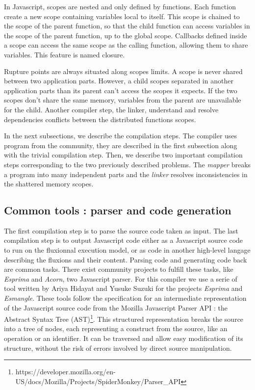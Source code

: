 In Javascript, scopes are nested and only defined by functions.
Each function create a new scope containing variables local to itself.
This scope is chained to the scope of the parent function, so that the child function can access variables in the scope of the parent function, up to the global scope.
Callbacks defined inside a scope can access the same scope as the calling function, allowing them to share variables.
This feature is named closure.

Rupture points are always situated along scopes limits.
A scope is never shared between two application parts.
However, a child scopes separated in another application parts than its parent can't access the scopes it expects.
If the two scopes don't share the same memory, variables from the parent are unavailable for the child.
Another compiler step, the linker, understand and resolve dependencies conflicts between the distributed functions scopes.

In the next subsections, we describe the compilation steps.
The compiler uses program from the community, they are described in the first subsection along with the trivial compilation step.
Then, we describe two important compilation steps corresponding to the two previously described problems.
The \textit{mapper} breaks a program into many independent parts and the \textit{linker} resolves inconsistencies in the shattered memory scopes.

\subsection{Common tools : parser and code generation}

The first compilation step is to parse the source code taken as input.
The last compilation step is to output Javascript code either as a Javascript source code to run on the fluxionnal execution model, or as code in another high-level langage describing the fluxions and their content.
Parsing code and generating code back are common tasks.
There exist community projects to fulfill these tasks, like \textit{Esprima} and \textit{Acorn}, two Javascript parser.
For this compiler we use a serie of tool written by Ariya Hidayat and Yusuke Suzuki for the projects \textit{Esprima} and \textit{Esmangle}.
These tools follow the specification for an intermediate representation of the Javascript source code from the Mozilla Javascript Parser API : the Abstract Syntax Tree (AST)\footnote{\raggedright https://developer.mozilla.org/en-US/docs/Mozilla/Projects/SpiderMonkey/Parser\_API}.
This structured representation breaks the source into a tree of nodes, each representing a construct from the source, like an operation or an identifier.
It can be traversed and allow easy modification of its structure, without the risk of errors involved by direct source manipulation.

